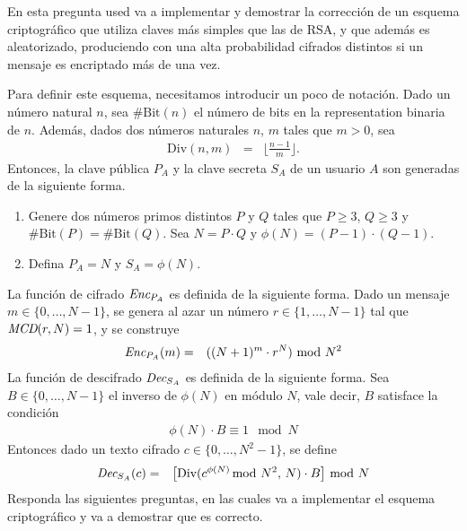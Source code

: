 
\newcommand{\bbit}{\#\text{Bit}}
\newcommand{\dv}{\text{Div}}

En esta pregunta used va a implementar y demostrar la corrección de un
esquema criptográfico que utiliza claves más simples que las de RSA, y
que además es aleatorizado, produciendo con una alta probabilidad cifrados distintos si un
mensaje es encriptado más de una vez.

Para definir este esquema, necesitamos introducir un poco de
notación. Dado un número natural $n$, sea $\#\text{Bit}(n)$ el número
de bits en la representation binaria de $n$. Además, dados dos números
naturales $n$, $m$ tales que $m > 0$, sea
  \begin{eqnarray*}
\dv(n,m) &=& \bigg\lfloor \frac{n-1}{m} \bigg\rfloor.
  \end{eqnarray*}
Entonces, la clave pública $P_A$ y la clave
secreta $S_A$ de un usuario $A$ son generadas de la siguiente forma.
\begin{enumerate}
\item Genere dos números primos distintos $P$ y $Q$ tales que $P \geq
  3$, $Q \geq 3$ y $\bbit(P) = \bbit(Q)$.  Sea $N = P \cdot Q$ y
  $\phi(N) = (P-1) \cdot (Q-1)$.

\item Defina $P_A = N$ y $S_A = \phi(N)$.
\end{enumerate}
La función de cifrado $\textit{Enc}_{P_A}$ es definida de la siguiente
forma. Dado un mensaje $m \in \{0, \ldots, N-1\}$, se genera al azar un número $r
\in \{1, \ldots, N-1\}$ tal que $\textit{MCD}(r, N) = 1$, y se construye
  \begin{eqnarray*}
    \textit{Enc}_{P_A}(m) &=& ((N+1)^m \cdot r^N) \!\! \mod N^2
  \end{eqnarray*}
La función de descifrado $\textit{Dec}_{S_A}$ es definida de la siguiente
forma. Sea $B \in \{0, \ldots, N-1\}$ el inverso de $\phi(N)$ en módulo
$N$, vale decir, $B$ satisface la condición
\begin{eqnarray*}
  \phi(N) \cdot B \equiv 1  \mod N
\end{eqnarray*}
Entonces dado un texto cifrado $c \in \{0, \ldots, N^2-1\}$, se define 
  \begin{eqnarray*}
    \Dec_{S_A}(c) &=&   \big[\dv(c^{\phi(N)} \!\!\!\mod N^2,\, N)  \cdot B \big] \!\!\mod N
  \end{eqnarray*}
  Responda las siguientes preguntas, en las cuales va a implementar el esquema criptográfico y va a demostrar que es correcto.
